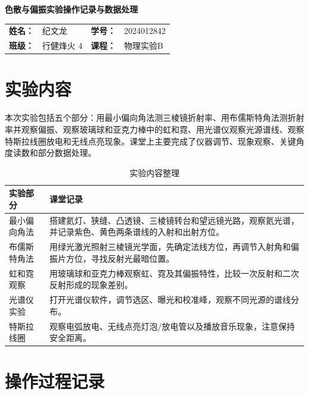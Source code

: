 \documentclass[UTF8,12pt,a4paper]{ctexart}
\begin{document}
\begin{center}
    {\bfseries 色散与偏振实验操作记录与数据处理}
\end{center}

\vspace{0.4em}

\begin{center}
\small
\begin{tabularx}{0.82\textwidth}{@{}>{\bfseries}rY>{\bfseries}rY@{}}
姓名：& 纪文龙 & 学号：& 2024012842 \\
班级：& 行健烽火 4 & 课程：& 物理实验B \\
\end{tabularx}
\end{center}

\section{实验内容}

本次实验包括五个部分：用最小偏向角法测三棱镜折射率、用布儒斯特角法测折射率并观察偏振、观察玻璃球和亚克力棒中的虹和霓、用光谱仪观察光源谱线、观察特斯拉线圈放电和无线点亮现象。课堂上主要完成了仪器调节、现象观察、关键角度读数和部分数据处理。

\begin{table}[H]
\centering
\caption{实验内容整理}
\small
\begin{tabularx}{0.96\textwidth}{p{}Y}
\toprule
实验部分 & 课堂记录 \\
\midrule
最小偏向角法 & 搭建氦灯、狭缝、凸透镜、三棱镜转台和望远镜光路，观察氦光谱，并记录紫色、黄色两条谱线的入射和出射方位。 \\
布儒斯特角法 & 用绿光激光照射三棱镜光学面，先确定法线方位，再调节入射角和偏振片方位，寻找反射光最暗位置。 \\
虹和霓观察 & 用玻璃球和亚克力棒观察虹、霓及其偏振特性，比较一次反射和二次反射形成的现象差别。 \\
光谱仪实验 & 打开光谱仪软件，调节选区、曝光和校准峰，观察不同光源的谱线分布。 \\
特斯拉线圈 & 观察电弧放电、无线点亮灯泡/放电管以及播放音乐现象，注意保持安全距离。 \\
\bottomrule
\end{tabularx}
\end{table}

\section{操作过程记录}
\end{document}

